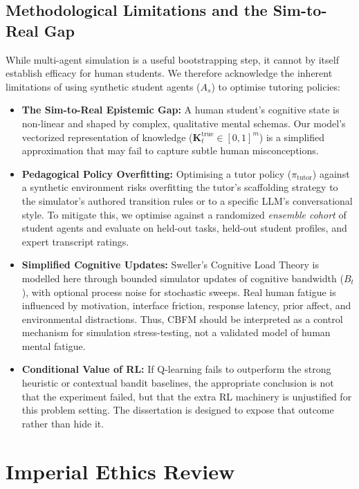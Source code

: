 \documentclass[11pt,a4paper]{report}
\begin{document}
\subsection{Methodological Limitations and the Sim-to-Real Gap}
While multi-agent simulation is a useful bootstrapping step, it cannot by itself establish efficacy for human students. We therefore acknowledge the inherent limitations of using synthetic student agents ($A_s$) to optimise tutoring policies:
\begin{itemize}
    \item \textbf{The Sim-to-Real Epistemic Gap:} A human student's cognitive state is non-linear and shaped by complex, qualitative mental schemas. Our model's vectorized representation of knowledge ($\mathbf{K}^{\text{true}}_t \in [0, 1]^m$) is a simplified approximation that may fail to capture subtle human misconceptions.
    \item \textbf{Pedagogical Policy Overfitting:} Optimising a tutor policy ($\pi_{\text{tutor}}$) against a synthetic environment risks overfitting the tutor's scaffolding strategy to the simulator's authored transition rules or to a specific LLM's conversational style. To mitigate this, we optimise against a randomized \textit{ensemble cohort} of student agents and evaluate on held-out tasks, held-out student profiles, and expert transcript ratings.
    \item \textbf{Simplified Cognitive Updates:} Sweller's Cognitive Load Theory is modelled here through bounded simulator updates of cognitive bandwidth ($B_t$), with optional process noise for stochastic sweeps. Real human fatigue is influenced by motivation, interface friction, response latency, prior affect, and environmental distractions. Thus, CBFM should be interpreted as a control mechanism for simulation stress-testing, not a validated model of human mental fatigue.
    \item \textbf{Conditional Value of RL:} If Q-learning fails to outperform the strong heuristic or contextual bandit baselines, the appropriate conclusion is not that the experiment failed, but that the extra RL machinery is unjustified for this problem setting. The dissertation is designed to expose that outcome rather than hide it.
\end{itemize}

\section{Imperial Ethics Review}
\end{document}
